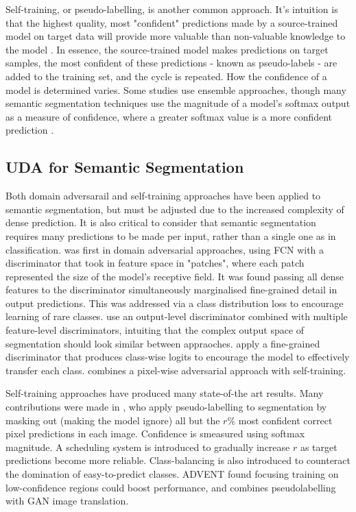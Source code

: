 \documentclass[a4paper,12pt]{report}
\begin{document}
Self-training, or pseudo-labelling, is another common approach. It's intuition is that the highest quality, most "confident" predictions made by a source-trained model on target data will provide more valuable than non-valuable knowledge to the model \cite{wilson_survey_2020} \cite{kamnitsas_transductive_2021}. In essence, the source-trained model makes predictions on target samples, the most confident of these predictions - known as pseudo-labels - are added to the training set, and the cycle is repeated. How the confidence of a model is determined varies. Some studies use ensemble approaches, though many semantic segmentation techniques use the magnitude of a model's softmax output as a measure of confidence, where a greater softmax value is a more confident prediction \cite{zou_domain_2018}.


\subsection*{UDA for Semantic Segmentation}

Both domain adversarail and self-training approaches have been applied to semantic segmentation, but must be adjusted due to the increased complexity of dense prediction. It is also critical to consider that semantic segmentation requires many predictions to be made per input, rather than a single one as in classification. \cite{hoffman_fcns_2016} was first in domain adversarial approaches, using FCN with a discriminator that took in feature space in "patches", where each patch represented the size of the model's receptive field. It was found passing all dense features to the discriminator simultaneously marginalised fine-grained detail in output predictions. This was addressed via a class distribution loss to encourage learning of rare classes. \cite{tsai_learning_2020} use an output-level discriminator combined with multiple feature-level discriminators, intuiting that the complex output space of segmentation should look similar between appraoches. \cite{wang_classes_2020} apply a fine-grained discriminator that produces class-wise logits to encourage the model to effectively transfer each class. \cite{michieli_adversarial_2020} combines a pixel-wise adversarial approach with self-training.

Self-training approaches have produced many state-of-the art results. Many contributions were made in \cite{zou_domain_2018}, who apply pseudo-labelling to segmentation by masking out (making the model ignore) all but the $r\%$ most confident correct pixel predictions in each image. Confidence is smeasured using softmax magnitude. A scheduling system is introduced to gradually increase $r$ as target predictions become more reliable. Class-balancing is also introduced to counteract the domination of easy-to-predict classes. ADVENT \cite{vu_advent_2019} found focusing training on low-confidence regions could boost performance, and \cite{li_bidirectional_2019} combines pseudolabelling with GAN image translation.
\end{document}
